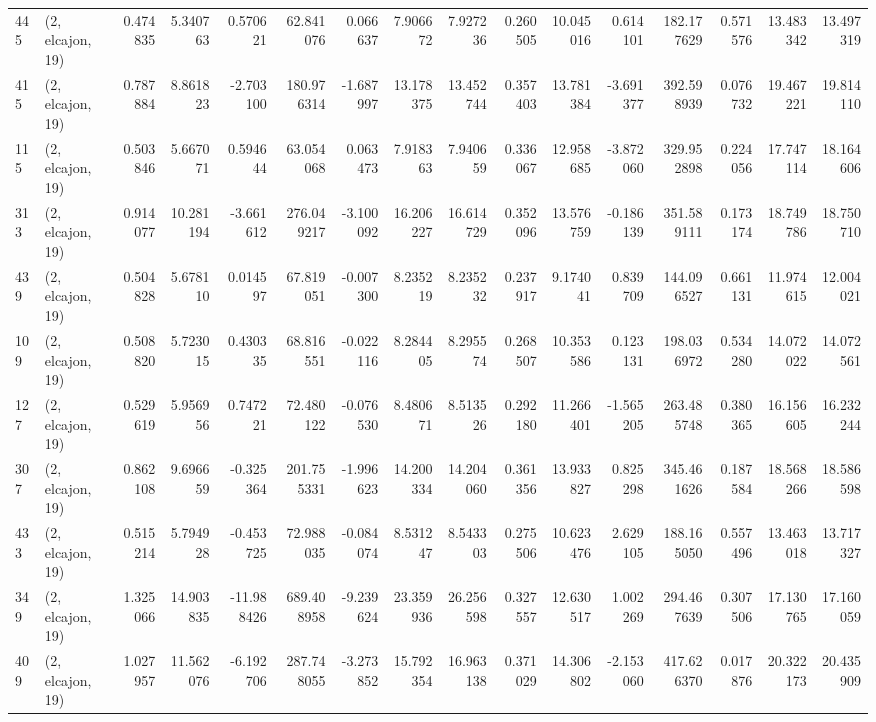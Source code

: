\begin{tabular}{llrrrrrrrrrrrrrr}
445 &  (2, elcajon, 19) &   0.474835 &   5.340763 &   0.570621 &    62.841076 &   0.066637 &   7.906672 &   7.927236 &  0.260505 &  10.045016 &   0.614101 &   182.177629 &   0.571576 &  13.483342 &  13.497319 \\
415 &  (2, elcajon, 19) &   0.787884 &   8.861823 &  -2.703100 &   180.976314 &  -1.687997 &  13.178375 &  13.452744 &  0.357403 &  13.781384 &  -3.691377 &   392.598939 &   0.076732 &  19.467221 &  19.814110 \\
115 &  (2, elcajon, 19) &   0.503846 &   5.667071 &   0.594644 &    63.054068 &   0.063473 &   7.918363 &   7.940659 &  0.336067 &  12.958685 &  -3.872060 &   329.952898 &   0.224056 &  17.747114 &  18.164606 \\
313 &  (2, elcajon, 19) &   0.914077 &  10.281194 &  -3.661612 &   276.049217 &  -3.100092 &  16.206227 &  16.614729 &  0.352096 &  13.576759 &  -0.186139 &   351.589111 &   0.173174 &  18.749786 &  18.750710 \\
439 &  (2, elcajon, 19) &   0.504828 &   5.678110 &   0.014597 &    67.819051 &  -0.007300 &   8.235219 &   8.235232 &  0.237917 &   9.174041 &   0.839709 &   144.096527 &   0.661131 &  11.974615 &  12.004021 \\
109 &  (2, elcajon, 19) &   0.508820 &   5.723015 &   0.430335 &    68.816551 &  -0.022116 &   8.284405 &   8.295574 &  0.268507 &  10.353586 &   0.123131 &   198.036972 &   0.534280 &  14.072022 &  14.072561 \\
127 &  (2, elcajon, 19) &   0.529619 &   5.956956 &   0.747221 &    72.480122 &  -0.076530 &   8.480671 &   8.513526 &  0.292180 &  11.266401 &  -1.565205 &   263.485748 &   0.380365 &  16.156605 &  16.232244 \\
307 &  (2, elcajon, 19) &   0.862108 &   9.696659 &  -0.325364 &   201.755331 &  -1.996623 &  14.200334 &  14.204060 &  0.361356 &  13.933827 &   0.825298 &   345.461626 &   0.187584 &  18.568266 &  18.586598 \\
433 &  (2, elcajon, 19) &   0.515214 &   5.794928 &  -0.453725 &    72.988035 &  -0.084074 &   8.531247 &   8.543303 &  0.275506 &  10.623476 &   2.629105 &   188.165050 &   0.557496 &  13.463018 &  13.717327 \\
349 &  (2, elcajon, 19) &   1.325066 &  14.903835 & -11.988426 &   689.408958 &  -9.239624 &  23.359936 &  26.256598 &  0.327557 &  12.630517 &   1.002269 &   294.467639 &   0.307506 &  17.130765 &  17.160059 \\
409 &  (2, elcajon, 19) &   1.027957 &  11.562076 &  -6.192706 &   287.748055 &  -3.273852 &  15.792354 &  16.963138 &  0.371029 &  14.306802 &  -2.153060 &   417.626370 &   0.017876 &  20.322173 &  20.435909 \\

\end{tabular}
